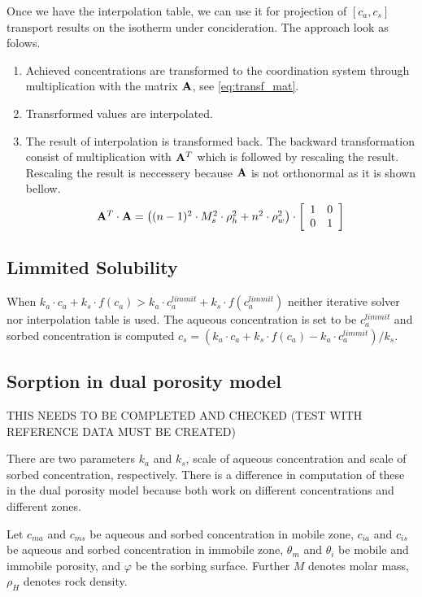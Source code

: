 Once we have the interpolation table, we can use it for projection of ${[c_a,c_s]}$ transport results on the isotherm under concideration. The approach look as folows.
\begin{enumerate}
 \item Achieved concentrations are transformed to the coordination system through multiplication with the matrix ${\bf A}$, see \ref{eq:transf_mat}.
 \item Transrformed values are interpolated.
 \item The result of interpolation is transformed back. The backward transformation consist of multiplication with ${\bf A}^T$ which is followed by rescaling the result. Rescaling the result is neccessery because  ${\bf A}$ is not orthonormal as it is shown bellow.
 \[
 \begin{array}{l}
 {\bf A}^T\cdot{\bf A} =
  \left((n - 1)^2\cdot M_s^2\cdot \rho_h^2 + n^2\cdot \rho_w^2\right)\cdot\left[\begin{array}{cc}
    1 & 0\\
    0 & 1
  \end{array}\right]
  \end{array}
 \]
\end{enumerate}


\subsection{Limmited Solubility}\label{subsec:lim_solub}
When $k_a\cdot c_a + k_s\cdot f(c_a) > k_a\cdot c_a^{limmit} + k_s\cdot f(c_a^{limmit})$ neither iterative solver nor interpolation table is used. The aqueous concentration is set to be $c_a^{limmit}$ and sorbed concentration is computed $c_s = (k_a\cdot c_a + k_s\cdot f(c_a) - k_a\cdot c_a^{limmit})/k_s$.

\subsection{Sorption in dual porosity model} \label{subsec:sorp_dual_por}
THIS NEEDS TO BE COMPLETED AND CHECKED (TEST WITH REFERENCE DATA MUST BE CREATED)
\vspace{1cm}

There are two parameters $k_a$ and $k_s$, scale of aqueous concentration and scale of sorbed concentration, respectively.  
There is a difference in computation of these in the dual porosity model because both work on different concentrations
and different zones.

Let $c_{ma}$ and $c_{ms}$ be aqueous and sorbed concentration in mobile zone, 
$c_{ia}$ and $c_{is}$ be aqueous and sorbed concentration in immobile zone,
$\theta_m$ and $\theta_i$ be mobile and immobile porosity,
and $\varphi$ be the sorbing surface.
Further $M$ denotes molar mass, $\rho_H$ denotes rock density.

